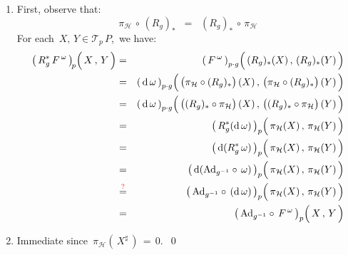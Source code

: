 \proof
\begin{enumerate}
\item
	First, observe that:
	\begin{equation*}
	\pi_{\mathcal{H}} \,\circ\, (R_{g})_{*}
	\;\; = \;\;
		(R_{g})_{*} \,\circ\, \pi_{\mathcal{H}}
	\end{equation*}
	For each \,$X,\, Y \in \mathcal{T}_{p}\,P$,\, we have:
	\begin{eqnarray*}
	\left(\,R_{g}^{*}\,F^{\,\omega}\,\right)_{\!p}\!\left(\,\overset{{\color{white}.}}{X}\,,\,Y\,\right)
	& = &
		\left(\,F^{\,\omega}\,\right)_{p \cdot g}\!\left(\,
			(R_{g})_{*}(\overset{{\color{white}.}}{X})
			\,,\,
			(R_{g})_{*}(Y)
			\,\right)
	\\
	& = &
		\left(\,\d\,\omega\,\right)_{p \cdot g}\!\left(\,
			\left(\pi_{\mathcal{H}}\overset{{\color{white}.}}{\circ}(R_{g})_{*}\right)
			(\overset{{\color{white}.}}{X})
			\,,\,
			\left(\pi_{\mathcal{H}}\overset{{\color{white}.}}{\circ}(R_{g})_{*}\right)(Y)
			\,\right)
	\\
	& = &
		\left(\,\d\,\omega\,\right)_{p \cdot g}\!\left(\,
			\left((R_{g})_{*}\overset{{\color{white}.}}{\circ}\pi_{\mathcal{H}}\right)
			(\overset{{\color{white}.}}{X})
			\,,\,
			\left((R_{g})_{*}\overset{{\color{white}.}}{\circ}\pi_{\mathcal{H}}\right)(Y)
			\,\right)
	\\
	& = &
		\left(\,R_{g}^{*}(\d\,\omega)\,\right)_{p}\!\left(\,
			\pi_{\mathcal{H}}(\overset{{\color{white}.}}{X})
			\,,\,
			\pi_{\mathcal{H}}(Y)
			\,\right)
	\\
	& = &
		\left(\,\d(R_{g}^{*}\,\omega)\,\right)_{p}\!\left(\,
			\pi_{\mathcal{H}}(\overset{{\color{white}.}}{X})
			\,,\,
			\pi_{\mathcal{H}}(Y)
			\,\right)
	\\
	& = &
		\left(\,\d(\Ad_{g^{-1}}\circ\,\omega)\,\right)_{p}\!\left(\,
			\pi_{\mathcal{H}}(\overset{{\color{white}.}}{X})
			\,,\,
			\pi_{\mathcal{H}}(Y)
			\,\right)
	\\
	& \overset{{\color{red}?}}{=} &
		\left(\,\Ad_{g^{-1}}\circ\,(\d\,\omega)\,\right)_{p}\!\left(\,
			\pi_{\mathcal{H}}(\overset{{\color{white}.}}{X})
			\,,\,
			\pi_{\mathcal{H}}(Y)
			\,\right)
	\\
	& = &
		\left(\,\Ad_{g^{-1}}\circ\,F^{\,\omega}\,\right)_{p}\!\left(\,
			\overset{{\color{white}.}}{X}
			\,,\,
			Y
			\,\right)
	\end{eqnarray*}
\item
	Immediate since \,$\pi_{\mathcal{H}}\!\left(\,X^{\sharp}\,\right) \,=\, 0$.\,
\qed
\end{enumerate}

